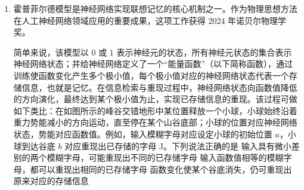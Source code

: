 \documentclass[\gkver]{gaokaozhenti}
\begin{document}
\begin{enumerate}
{D．该光电导效应仅在半导体内部激发自由载流子，不存在逸出半导体的光电子。当半导体两端电压为 $0$ 时，内部没有外电场驱动自由载流子定向移动，因此电流表示数为 $0$，故 D 错误，符合题意。

故选 D。
}
\item
霍普菲尔德模型是神经网络实现联想记忆的核心机制之一。作为物理思想方法在人工神经网络领域应用的重要成果，这项工作获得 2024 年诺贝尔物理学奖。

简单来说，该模型以 $0$ 或 $1$ 表示神经元的状态，所有神经元状态的集合表示神经网络状态；并给神经网络定义了一个“能量函数”（以下简称函数），通过训练使函数变化产生多个极小值，每个极小值对应的神经网络状态代表一个存储信息，也就是记忆。在信息检索与重现过程中，神经网络状态向函数值降低的方向演化，最终达到某个极小值为止，实现已存储信息的重现。该过程可做如下类比：在如图所示的峰谷交错地形中某位置释放一个小球，小球始终沿着重力势能减小的方向运动，直至停在某个山谷底部；小球的位置对应神经网络状态，势能对应函数值。例如，输入模糊字母对应设定小球的初始位置 $a$，小球到达谷底 $b$ 对应重现出已存储的字母 J。下列说法正确的是 
\onepicture[w=11.44cm]{}
{输入具有微小差别的两个模糊字母，可能重现出不同的已存储字母}
{输入函数值相等的模糊字母，都可以重现出相同的已存储字母}
{函数变化使某个谷底消失，仍可重现出原来对应的存储信息}

\end{enumerate}
\end{document}

